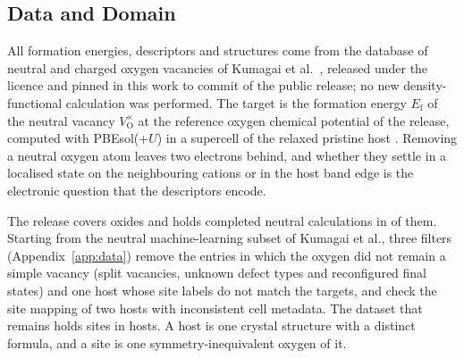\subsection{Data and Domain}
\label{sec:data}

All formation energies, descriptors and structures come from the database of neutral and charged oxygen vacancies of Kumagai et al.\ \citep{Kumagai2021insights}, released under the \ccby{} licence and pinned in this work to commit \releasecommit{} of the public release; no new density-functional calculation was performed. The target is the formation energy $E_\mathrm{f}$ of the neutral vacancy $V_\mathrm{O}^{\times}$ at the reference oxygen chemical potential of the release, computed with PBEsol(+$U$) in a supercell of the relaxed pristine host \citep{Kumagai2021insights}. Removing a neutral oxygen atom leaves two electrons behind, and whether they settle in a localised state on the neighbouring cations or in the host band edge is the electronic question that the descriptors encode.

The release covers \numNetReleaseOxides{} oxides and holds \numFilterCascadeStepsReleaseSites{} completed neutral calculations in \numFilterCascadeStepsReleaseHosts{} of them. Starting from the neutral machine-learning subset of Kumagai et al., three filters (Appendix~\ref{app:data}) remove the entries in which the oxygen did not remain a simple vacancy (split vacancies, unknown defect types and reconfigured final states) and one host whose site labels do not match the targets, and check the site mapping of two hosts with inconsistent cell metadata. The dataset that remains holds \numFilterCascadeStepsFinalSites{} sites in \numFilterCascadeStepsFinalHosts{} hosts. A host is one crystal structure with a distinct formula, and a site is one symmetry-inequivalent oxygen of it.

